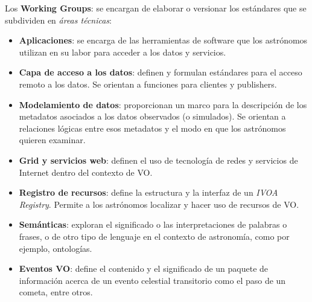 Los \textbf{Working Groups}: se encargan de elaborar
o versionar los estándares que se subdividen en \emph{áreas técnicas}: \\
\begin{itemize}
	\item \textbf{Aplicaciones}: se encarga de las herramientas de software que los
		astrónomos utilizan en su labor para acceder a los datos y servicios. \\
	\item \textbf{Capa de acceso a los datos}: definen y formulan estándares para el
		acceso remoto a los datos. Se orientan a funciones para clientes y publishers. \\
	\item \textbf{Modelamiento de datos}: proporcionan un marco para la descripción de
		los metadatos asociados a los datos observados (o simulados). Se orientan a
		relaciones lógicas entre esos metadatos y el modo en que los astrónomos quieren examinar. \\
	\item \textbf{Grid y servicios web}: definen el uso de tecnología de redes y
		servicios de Internet dentro del contexto de VO. \\
	\item \textbf{Registro de recursos}: define la estructura y la interfaz de un \textit{IVOA
		Registry}. Permite a los astrónomos localizar y hacer uso de recursos de VO. \\
	\item \textbf{Semánticas}: exploran el significado o las interpretaciones de palabras o frases,
		o de otro tipo de lenguaje en el contexto de astronomía, como por ejemplo, ontologías. \\
	\item \textbf{Eventos VO}: define el contenido y el significado de un paquete de información
		acerca de un evento celestial transitorio como el paso de un cometa, entre otros. \\
\end{itemize}
